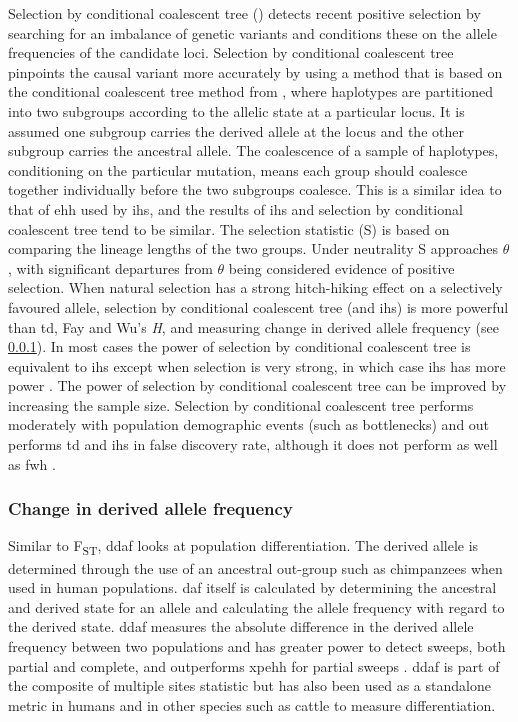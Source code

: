 \documentclass[]{report}
\begin{document}
Selection by conditional coalescent tree (\citet{Wang2014}) detects
recent positive selection by searching for an imbalance of genetic
variants and conditions these on the allele frequencies of the candidate
loci. Selection by conditional coalescent tree pinpoints the causal
variant more accurately by using a method that is based on the
conditional coalescent tree method from \citet{Wiuf1999}, where
haplotypes are partitioned into two subgroups according to the allelic
state at a particular locus. It is assumed one subgroup carries the
derived allele at the locus and the other subgroup carries the ancestral
allele. The coalescence of a sample of haplotypes, conditioning on the
particular mutation, means each group should coalesce together
individually before the two subgroups coalesce. This is a similar idea
to that of \gls{ehh} used by \gls{ihs}, and the results of \gls{ihs} and
selection by conditional coalescent tree tend to be similar. The
selection statistic (S) is based on comparing the lineage lengths of the
two groups. Under neutrality S approaches \(\theta\), with significant
departures from \(\theta\) being considered evidence of positive
selection. When natural selection has a strong hitch-hiking effect on a
selectively favoured allele, selection by conditional coalescent tree
(and \gls{ihs}) is more powerful than \gls{td}, Fay and Wu's \emph{H},
and measuring change in derived allele frequency (see \ref{dafsection}).
In most cases the power of selection by conditional coalescent tree is
equivalent to \gls{ihs} except when selection is very strong, in which
case \gls{ihs} has more power \citep{Wang2014}. The power of selection
by conditional coalescent tree can be improved by increasing the sample
size. Selection by conditional coalescent tree performs moderately with
population demographic events (such as bottlenecks) and out performs
\gls{td} and \gls{ihs} in false discovery rate, although it does not
perform as well as \gls{fwh} \citep{Wang2014}.

\subsubsection{Change in derived allele frequency}\label{dafsection}

Similar to F\textsubscript{ST}, \gls{ddaf} looks at population
differentiation. The derived allele is determined through the use of an
ancestral out-group such as chimpanzees when used in human populations.
\Gls{daf} itself is calculated by determining the ancestral and derived
state for an allele and calculating the allele frequency with regard to
the derived state. \gls{ddaf} measures the absolute difference in the
derived allele frequency between two populations \citep{Grossman2010}
and has greater power to detect sweeps, both partial and complete, and
outperforms \gls{xpehh} for partial sweeps \citep{Colonna2014}.
\gls{ddaf} is part of the composite of multiple sites statistic
\citep{Grossman2010} but has also been used as a standalone metric in
humans \citep{Colonna2014, Gudbjartsson2015} and in other species such
as cattle \citep{Randhawa2014} to measure differentiation.
\end{document}

